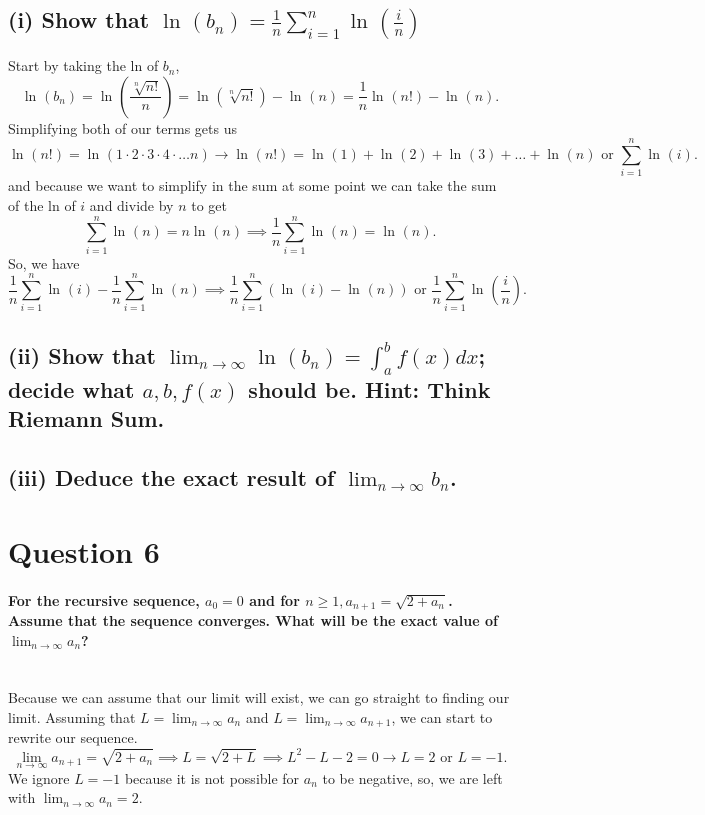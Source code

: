 \subsection*{(i) Show that $ \ln^{  } \left( b_n \right) =\frac{ 1 }{ n } \sum_{ i=1 } ^{ n } \ln^{  } \left( \frac{ i }{ n }  \right)$}%
Start by taking the ln of $ b_n $,
\[
\ln^{  } \left( b_n \right) = \ln^{  } \left( \frac{ \sqrt[ n ]{ n! }  }{ n }  \right) = \ln^{  } \left( \sqrt[ n ]{ n! }  \right) - \ln^{  } \left( n \right) = \frac{ 1 }{ n } \ln^{  } \left( n! \right) -\ln^{  } \left( n \right) 
.\] 
Simplifying both of our terms gets us
\[
\ln^{  } \left( n! \right) = \ln^{  } \left( 1\cdot 2\cdot 3\cdot 4\cdot \ldots n \right) \to \ln^{  } \left( n! \right) = \ln^{  } \left( 1 \right) + \ln^{  } \left( 2 \right) + \ln^{  } \left( 3 \right) + \ldots + \ln^{  } \left( n \right) \text{ or } \sum_{ i=1 } ^{ n } \ln^{  } \left( i \right)
.\] 
and because we want to simplify in the sum at some point we can take the sum of the ln of $ i $ and divide by $ n $ to get
\[
\sum_{ i=1 } ^{ n }\ln^{  } \left( n \right) =n\ln^{  } \left( n \right) \implies \frac{ 1 }{ n } \sum_{ i=1 } ^{ n } \ln^{  } \left( n \right) =\ln^{  } \left( n \right)  
.\] 
So, we have
\[
\frac{ 1 }{ n } \sum_{ i=1 } ^{ n } \ln^{  } \left( i \right) - \frac{ 1 }{ n } \sum_{ i=1 } ^{ n } \ln^{  } \left( n \right) \implies \frac{ 1 }{ n } \sum_{ i=1 } ^{ n } \left( \ln^{  } \left( i \right) -\ln^{  } \left( n \right)  \right) \text{ or } \frac{ 1 }{ n } \sum_{ i=1 } ^{ n } \ln^{  } \left( \frac{ i }{ n }  \right) 
.\] 

\subsection*{(ii) Show that $ \lim_{ n \to \infty} \ln^{  } \left( b_n \right) =\int_{ a }^{ b } f\left( x \right) dx$; decide what $ a,b,f\left( x \right)  $ should be. Hint: Think Riemann Sum.}%

\subsection*{(iii) Deduce the exact result of $ \lim_{ n \to \infty} b_n $.}%
\newpage
\section*{Question 6}%
\paragraph{For the recursive sequence, $ a_0 =0$ and for $ n\ge 1, a_{ n+1 }=\sqrt{ 2+ a_n} $. Assume that the sequence converges. What will be the exact value of $ \lim_{ n \to \infty} a_{ n } $? \\ \\ }
Because we can assume that our limit will exist, we can go straight to finding our limit. Assuming that $ L=\lim_{ n \to \infty} a_n $ and $ L=\lim_{ n \to \infty} a_{ n+1 } $, we can start to rewrite our sequence. 
\[
\lim_{ n \to \infty} a_{ n+1 } = \sqrt{ 2+a_n} \implies L = \sqrt{ 2+L } \implies L^2-L-2= 0 \to L=2 \text{ or } L=-1
.\] 
We ignore $ L=-1 $ because it is not possible for $ a_n $ to be negative, so, we are left with $ \lim_{ n \to \infty} a_n =2 $.

